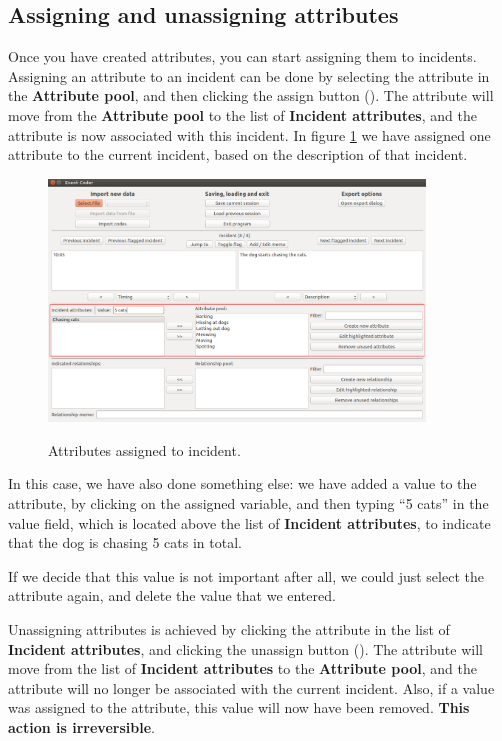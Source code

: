 \documentclass{memoir}
\begin{document}
\subsection{Assigning and unassigning attributes}
\label{sec:assigningunassigningattributes}

Once you have created attributes, you can start assigning them to incidents. Assigning an attribute to an incident can be done by selecting the attribute in the \textbf{Attribute pool}, and then clicking the assign button (\textbf{\guillemotleft}). The attribute will move from the \textbf{Attribute pool} to the list of \textbf{Incident attributes}, and the attribute is now associated with this incident. In figure \ref{fig:assignedattributes} we have assigned one attribute to the current incident, based on the description of that incident.

\begin{figure}[h!]
  \centering
  \caption{Attributes assigned to incident.}
  \includegraphics[width=100mm]{Screenshot_13.pdf}
  \label{fig:assignedattributes}
\end{figure}

In this case, we have also done something else: we have added a value to the attribute, by clicking on the assigned variable, and then typing ``5 cats'' in the value field, which is located above the list of \textbf{Incident attributes}, to indicate that the dog is chasing 5 cats in total.

If we decide that this value is not important after all, we could just select the attribute again, and delete the value that we entered.

Unassigning attributes is achieved by clicking the attribute in the list of \textbf{Incident attributes}, and clicking the unassign button (\textbf{\guillemotright}). The attribute will move from the list of \textbf{Incident attributes} to the \textbf{Attribute pool}, and the attribute will no longer be associated with the current incident. Also, if a value was assigned to the attribute, this value will now have been removed. \textbf{This action is irreversible}. 
\end{document}
